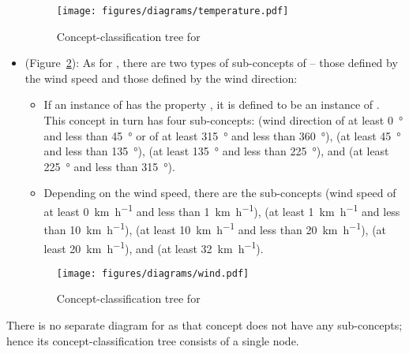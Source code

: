 \begin{itemize}
  \begin{figure}
    \centering
    \texttt{[image: figures/diagrams/temperature.pdf]}
    \caption{Concept-classification tree for }
    \label{fig:tree_temperature}
  \end{figure}

  \item {} (Figure~\ref{fig:tree_wind}): As for , there are two types of sub-concepts of  -- those defined by the wind speed and those defined by the wind direction:
    \begin{itemize}
      \item If an instance of  has the property , it is defined to be an instance of . This concept in turn has four sub-concepts:  (wind direction of at least \SI{0}{\degree} and less than \SI{45}{\degree} or of at least \SI{315}{\degree} and less than \SI{360}{\degree}),  (at least \SI{45}{\degree} and less than \SI{135}{\degree}),  (at least \SI{135}{\degree} and less than \SI{225}{\degree}), and  (at least \SI{225}{\degree} and less than \SI{315}{\degree}).
      
      \item Depending on the wind speed, there are the sub-concepts  (wind speed of at least \SI{0}{\kilo\metre\per\hour} and less than \SI{1}{\kilo\metre\per\hour}),  (at least \SI{1}{\kilo\metre\per\hour} and less than \SI{10}{\kilo\metre\per\hour}),  (at least \SI{10}{\kilo\metre\per\hour} and less than \SI{20}{\kilo\metre\per\hour}),  (at least \SI{20}{\kilo\metre\per\hour}), and  (at least \SI{32}{\kilo\metre\per\hour}).
      
    \end{itemize}
    
  \begin{figure}
    \centering
    \texttt{[image: figures/diagrams/wind.pdf]}
    \caption{Concept-classification tree for }
    \label{fig:tree_wind}
  \end{figure}

\end{itemize}

There is no separate diagram for  as that concept does not have any sub-concepts; hence its concept-classification tree consists of a single node.

